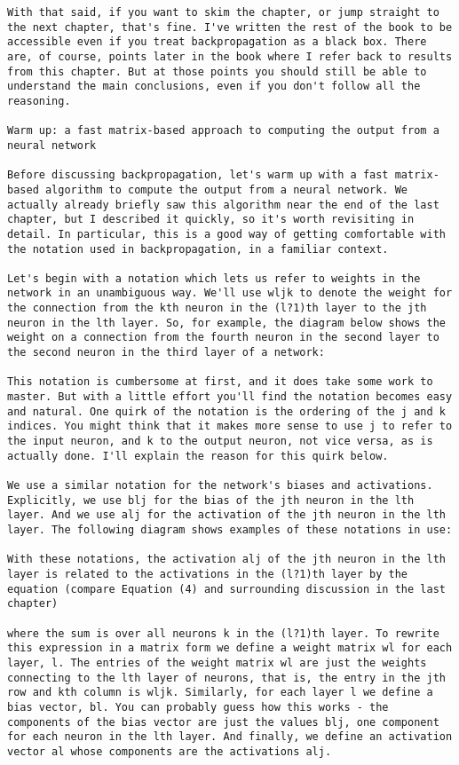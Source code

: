 \begin{lstlisting}
With that said, if you want to skim the chapter, or jump straight to the next chapter, that's fine. I've written the rest of the book to be accessible even if you treat backpropagation as a black box. There are, of course, points later in the book where I refer back to results from this chapter. But at those points you should still be able to understand the main conclusions, even if you don't follow all the reasoning.

Warm up: a fast matrix-based approach to computing the output from a neural network

Before discussing backpropagation, let's warm up with a fast matrix-based algorithm to compute the output from a neural network. We actually already briefly saw this algorithm near the end of the last chapter, but I described it quickly, so it's worth revisiting in detail. In particular, this is a good way of getting comfortable with the notation used in backpropagation, in a familiar context.

Let's begin with a notation which lets us refer to weights in the network in an unambiguous way. We'll use wljk to denote the weight for the connection from the kth neuron in the (l?1)th layer to the jth neuron in the lth layer. So, for example, the diagram below shows the weight on a connection from the fourth neuron in the second layer to the second neuron in the third layer of a network: 

This notation is cumbersome at first, and it does take some work to master. But with a little effort you'll find the notation becomes easy and natural. One quirk of the notation is the ordering of the j and k indices. You might think that it makes more sense to use j to refer to the input neuron, and k to the output neuron, not vice versa, as is actually done. I'll explain the reason for this quirk below.

We use a similar notation for the network's biases and activations. Explicitly, we use blj for the bias of the jth neuron in the lth layer. And we use alj for the activation of the jth neuron in the lth layer. The following diagram shows examples of these notations in use: 

With these notations, the activation alj of the jth neuron in the lth layer is related to the activations in the (l?1)th layer by the equation (compare Equation (4) and surrounding discussion in the last chapter) 

where the sum is over all neurons k in the (l?1)th layer. To rewrite this expression in a matrix form we define a weight matrix wl for each layer, l. The entries of the weight matrix wl are just the weights connecting to the lth layer of neurons, that is, the entry in the jth row and kth column is wljk. Similarly, for each layer l we define a bias vector, bl. You can probably guess how this works - the components of the bias vector are just the values blj, one component for each neuron in the lth layer. And finally, we define an activation vector al whose components are the activations alj.


\end{lstlisting}
